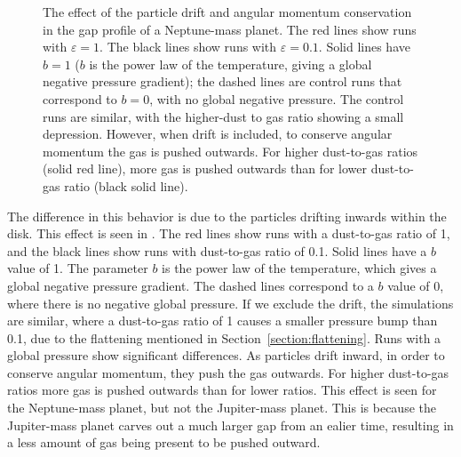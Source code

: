 \documentclass[onecolumn]{report}
\begin{document}
\begin{figure}
  \begin{center}
  \end{center}
  \caption{The effect of the particle drift and angular
    momentum conservation in the gap profile of a
    Neptune-mass planet. The red lines show runs with
    $\varepsilon=1$. The black lines show runs with $\varepsilon=0.1$. Solid lines have $b=1	$ ($b$ is
    the power law of the temperature, giving a global negative pressure
    gradient); the dashed lines are control runs that correspond to $b=0$, with no global
    negative pressure. The control runs are similar, with the
    higher-dust to gas ratio showing a small depression. However, when
    drift is included, to conserve angular momentum the gas is pushed
    outwards. For higher dust-to-gas ratios (solid red line),
    more gas is pushed outwards than for lower dust-to-gas ratio (black
    solid line).}
  \label{fig:drift}
\end{figure}

The difference in this behavior is due to the particles drifting inwards within the disk. This effect is seen in . The red lines show runs with a dust-to-gas ratio of 1, and the black lines show runs with dust-to-gas ratio of 0.1. Solid lines have a $b$ value of 1. The parameter $b$ is the power law of the temperature, which gives a global negative pressure gradient. The dashed lines correspond to a $b$ value of 0, where there is no negative global pressure. If we exclude the drift, the simulations are similar, where a dust-to-gas ratio of 1 causes a smaller pressure bump than 0.1, due to the flattening mentioned in Section~\ref{section:flattening}. Runs with a global pressure show significant differences. As particles drift inward, in order to conserve angular momentum, they push the gas outwards. For higher dust-to-gas ratios more gas is pushed outwards than for lower ratios. This effect is seen for the Neptune-mass planet, but not the Jupiter-mass planet. This is because the Jupiter-mass planet carves out a much larger gap from an ealier time, resulting in a less amount of gas being present to be pushed outward. 
\end{document}
